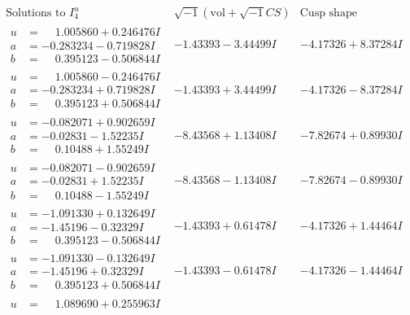 \documentclass[1p]{elsarticle_modified}
\theoremstyle{definition}
\newcommand{\I}{\sqrt{-1}}
\begin{document}
$$\begin{array}{c|c|c}  
\text{Solutions to }I^u_{4}& \I (\text{vol} + \sqrt{-1}CS) & \text{Cusp shape}\\
 \hline 
\begin{aligned}
u &= \phantom{-}1.005860 + 0.246476 I \\
a &= -0.283234 - 0.719828 I \\
b &= \phantom{-}0.395123 - 0.506844 I\end{aligned}
 & -1.43393 - 3.44499 I & -4.17326 + 8.37284 I \\ \hline\begin{aligned}
u &= \phantom{-}1.005860 - 0.246476 I \\
a &= -0.283234 + 0.719828 I \\
b &= \phantom{-}0.395123 + 0.506844 I\end{aligned}
 & -1.43393 + 3.44499 I & -4.17326 - 8.37284 I \\ \hline\begin{aligned}
u &= -0.082071 + 0.902659 I \\
a &= -0.02831 - 1.52235 I \\
b &= \phantom{-}0.10488 + 1.55249 I\end{aligned}
 & -8.43568 + 1.13408 I & -7.82674 + 0.89930 I \\ \hline\begin{aligned}
u &= -0.082071 - 0.902659 I \\
a &= -0.02831 + 1.52235 I \\
b &= \phantom{-}0.10488 - 1.55249 I\end{aligned}
 & -8.43568 - 1.13408 I & -7.82674 - 0.89930 I \\ \hline\begin{aligned}
u &= -1.091330 + 0.132649 I \\
a &= -1.45196 - 0.32329 I \\
b &= \phantom{-}0.395123 - 0.506844 I\end{aligned}
 & -1.43393 + 0.61478 I & -4.17326 + 1.44464 I \\ \hline\begin{aligned}
u &= -1.091330 - 0.132649 I \\
a &= -1.45196 + 0.32329 I \\
b &= \phantom{-}0.395123 + 0.506844 I\end{aligned}
 & -1.43393 - 0.61478 I & -4.17326 - 1.44464 I \\ \hline\begin{aligned}
u &= \phantom{-}1.089690 + 0.255963 I \\

\end{aligned}
\end{array}$$
\end{document}
